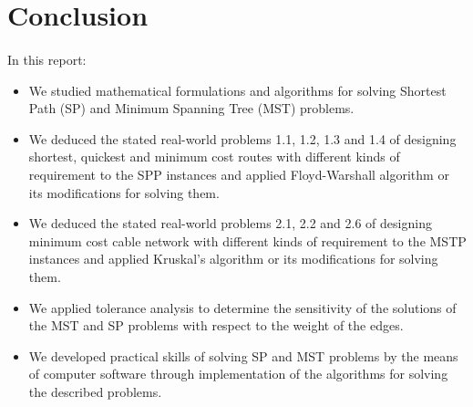 \section{Conclusion}
	\paragraph{}
	In this report:
\begin{itemize}
	\item We studied mathematical formulations and algorithms for solving Shortest Path (SP) and Minimum Spanning Tree (MST) problems.
	\item We deduced the stated real-world problems 1.1, 1.2, 1.3 and 1.4 of designing shortest, quickest and minimum cost routes with different kinds of requirement  to the SPP instances and applied Floyd-Warshall algorithm or its modifications for solving them.
	\item We deduced the stated real-world problems 2.1, 2.2 and 2.6 of designing minimum cost cable network with different kinds of requirement  to the MSTP instances and applied Kruskal's algorithm or its modifications for solving them.
	\item We applied tolerance analysis to determine the sensitivity of the solutions of the MST and SP problems with respect to the weight of the edges.
	\item We developed practical skills of solving SP and MST problems by the means of computer software through implementation of the algorithms for solving the described problems.
\end{itemize}
